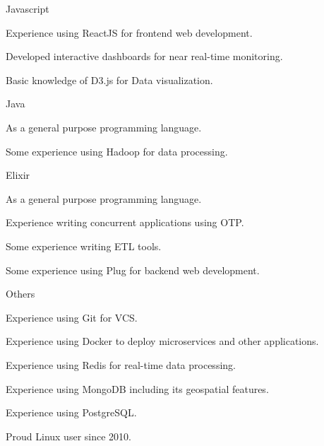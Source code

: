 \begin{cvskills}

\cvskill
{Javascript} %
{
  \begin{cvitems}
  \item {Experience using ReactJS for frontend web development.}
  \item {Developed interactive dashboards for near real-time monitoring. }
  \item {Basic knowledge of D3.js for Data visualization.}
  \end{cvitems}
}


\cvskill
{Java} %
{
  \begin{cvitems}
  \item {As a general purpose programming language.}
  \item {Some experience using Hadoop for data processing.}
  \end{cvitems}
}


\cvskill
{Elixir} %
{
  \begin{cvitems}
  \item {As a general purpose programming language.}
  \item {Experience writing concurrent applications using OTP.}
  \item {Some experience writing ETL tools.}
  \item {Some experience using Plug for backend web development.}
  \end{cvitems}
}


\cvskill
{Others} %
{
  \begin{cvitems}
  \item {Experience using Git for VCS.}
  \item {Experience using Docker to deploy microservices and other applications.}
  \item {Experience using Redis for real-time data processing.}
  \item {Experience using MongoDB including its geospatial features.}
  \item {Experience using PostgreSQL.}
  \item {Proud Linux user since 2010.}
  \end{cvitems}
}


\end{cvskills}
